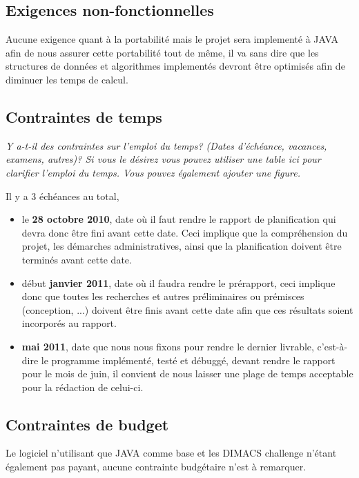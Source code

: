 \documentclass[runningheads]{llncs}
\begin{document}
\subsection{Exigences non-fonctionnelles}

Aucune exigence quant à la portabilité mais le projet sera implementé à JAVA afin de nous assurer cette portabilité tout de même, 
il va sans dire que les structures de données et algorithmes implementés devront être optimisés afin de diminuer les temps de 
calcul.

\subsection{Contraintes de temps}

\emph{Y a-t-il des contraintes sur l'emploi du temps? (Dates d'\'ech\'eance, vacances, examens, autres)? Si vous le d\'esirez vous pouvez utiliser une table ici pour clarifier l'emploi du temps. Vous pouvez \'egalement ajouter une figure.}

Il y a 3 échéances au total,
\begin{itemize}
\item le \textbf{28 octobre 2010}, date où il faut rendre le rapport de planification qui devra donc être fini avant cette date. 
Ceci implique que la compréhension du projet, les démarches administratives, ainsi que la planification doivent être terminés 
avant cette date.
\item début \textbf{janvier 2011}, date où il faudra rendre le prérapport, ceci implique donc que toutes les recherches et autres 
préliminaires ou prémisces (conception, ...) doivent être finis avant cette date afin que ces résultats soient incorporés au 
rapport.
\item \textbf{mai 2011}, date que nous nous fixons pour rendre le dernier livrable, c'est-à-dire le programme implémenté, testé et 
débuggé, devant rendre le rapport pour le mois de juin, il convient de nous laisser une plage de temps acceptable pour la 
rédaction de celui-ci.
\end{itemize}

\subsection{Contraintes de budget}

Le logiciel n'utilisant que JAVA comme base et les DIMACS challenge n'étant également pas payant, aucune contrainte budgétaire 
n'est à remarquer.
\end{document}
